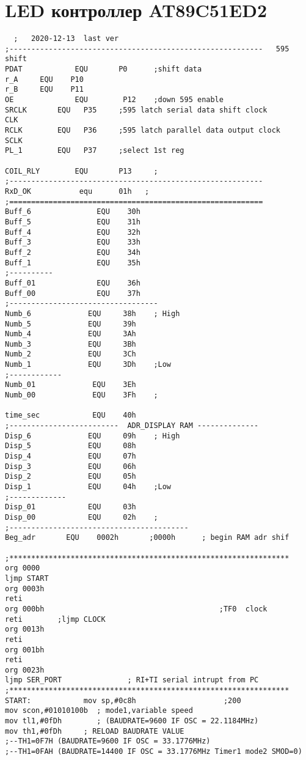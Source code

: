 \chapter{LED контроллер AT89C51ED2} %

\label{AppendixB} %
\pagecolor{white}

\begin{lstlisting}
  ;   2020-12-13  last ver
;----------------------------------------------------------   595 shift
PDAT         	EQU       P0      ;shift data
r_A		EQU	   P10
r_B		EQU	   P11
OE          	EQU        P12	  ;down 595 enable                                                               
SRCLK		EQU	  P35     ;595 latch serial data shift clock          CLK
RCLK		EQU	  P36     ;595 latch parallel data output clock       SCLK
PL_1		EQU	  P37	  ;select 1st reg    

COIL_RLY        EQU       P13     ;        
;----------------------------------------------------------
RxD_OK           equ      01h   ;
;==========================================================
Buff_6               EQU    30h                
Buff_5               EQU    31h 
Buff_4               EQU    32h
Buff_3               EQU    33h                
Buff_2               EQU    34h 
Buff_1               EQU    35h
;----------
Buff_01              EQU    36h 
Buff_00              EQU    37h
;----------------------------------  
Numb_6             EQU     38h    ; High
Numb_5             EQU     39h
Numb_4             EQU     3Ah
Numb_3             EQU     3Bh
Numb_2             EQU     3Ch
Numb_1             EQU     3Dh    ;Low
;------------
Numb_01             EQU    3Eh
Numb_00             EQU    3Fh    ; 

time_sec            EQU    40h
;-------------------------  ADR_DISPLAY RAM --------------
Disp_6             EQU     09h    ; High
Disp_5             EQU     08h
Disp_4             EQU     07h
Disp_3             EQU     06h
Disp_2             EQU     05h
Disp_1             EQU     04h    ;Low
;-------------
Disp_01            EQU     03h
Disp_00            EQU     02h    ;  
;----------------------------------------- 
Beg_adr       EQU    0002h       ;0000h      ; begin RAM adr shif

;****************************************************************
org 0000
ljmp START                  
org 0003h                             
reti        
org 000bh                                        ;TF0  clock
reti        ;ljmp CLOCK               
org 0013h
reti
org 001bh
reti	
org 0023h
ljmp SER_PORT               ; RI+TI serial intrupt from PC
;****************************************************************
START:            mov sp,#0c8h                    ;200 
mov scon,#01010100b  ; mode1,variable speed
mov tl1,#0fDh        ; (BAUDRATE=9600 IF OSC = 22.1184MHz)
mov th1,#0fDh	  ;	RELOAD BAUDRATE VALUE
;--TH1=0F7H (BAUDRATE=9600 IF OSC = 33.1776MHz)
;--TH1=0FAH (BAUDRATE=14400 IF OSC = 33.1776MHz Timer1 mode2 SMOD=0)


\end{lstlisting}
